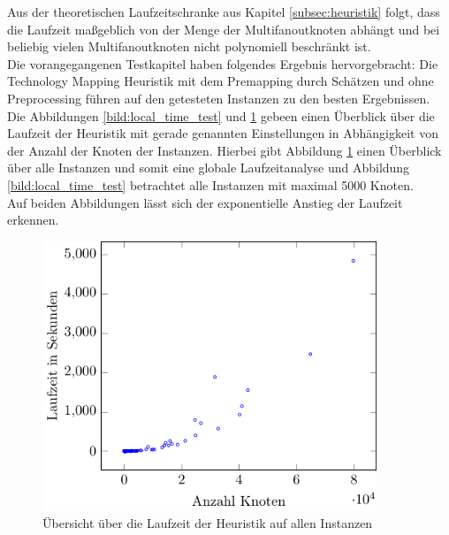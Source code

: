 \documentclass[11pt, a4paper, german]{article}
\newcommand{\TM}{Technology  Mapping }
\begin{document}
Aus der theoretischen Laufzeitschranke aus Kapitel \ref{subsec:heuristik} folgt, dass die Laufzeit maßgeblich von der Menge der Multifanoutknoten abhängt und bei beliebig vielen Multifanoutknoten nicht polynomiell beschr\"ankt ist. \\
Die vorangegangenen Testkapitel haben folgendes Ergebnis hervorgebracht: Die \TM Heuristik mit dem Premapping durch Sch\"atzen und ohne Preprocessing f\"uhren auf den getesteten Instanzen zu den besten Ergebnissen. \\
Die Abbildungen \ref{bild:local_time_test} und \ref{bild:global_time_test} gebeen einen \"Uberblick \"uber die Laufzeit der Heuristik mit gerade genannten Einstellungen in Abh\"angigkeit von der Anzahl der Knoten der Instanzen. 
Hierbei gibt Abbildung \ref{bild:global_time_test} einen \"Uberblick \"uber alle Instanzen und somit eine globale Laufzeitanalyse und Abbildung \ref{bild:local_time_test} betrachtet alle Instanzen mit maximal 5000 Knoten.\\
Auf beiden Abbildungen l\"asst sich der exponentielle Anstieg der Laufzeit erkennen.
\begin{figure}[h]
		\centering
		\includegraphics[width = 10cm]{pictures/tex_files/analysis/time_test}
		\caption{\"Ubersicht \"uber die Laufzeit der Heuristik auf allen Instanzen}
		\label{bild:global_time_test}
\end{figure}
\end{document}

